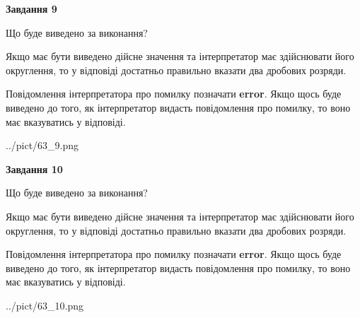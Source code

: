 \documentclass[12pt, ukrainian]{article}
\begin{document}
{\begin {Large}
{\begin {center}\textbf{Завдання 9}\end {center}}\par
Що буде виведено за виконання? \par

Якщо має бути виведено дійсне значення та інтерпретатор має здійснювати його округлення, 
то у відповіді достатньо правильно вказати два дробових розряди.

Повідомлення інтерпретатора про помилку позначати \textbf{error}.
Якщо щось буде виведено до того, як інтерпретатор видасть повідомлення про помилку, 
то воно має вказуватись у відповіді. \par

\begin{center}
	{../pict/63_9.png}
\end{center}
\newpage

{\begin {center}\textbf{Завдання 10}\end {center}}\par
Що буде виведено за виконання? \par

Якщо має бути виведено дійсне значення та інтерпретатор має здійснювати його округлення, 
то у відповіді достатньо правильно вказати два дробових розряди.

Повідомлення інтерпретатора про помилку позначати \textbf{error}.
Якщо щось буде виведено до того, як інтерпретатор видасть повідомлення про помилку, 
то воно має вказуватись у відповіді. \par

\begin{center}
	{../pict/63_10.png}
\end{center}
\newpage

\end {Large}}
\end{document}
